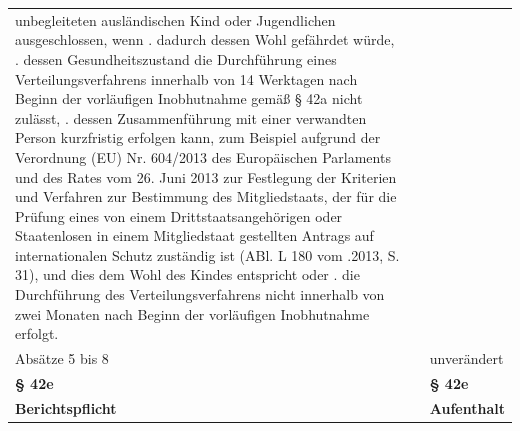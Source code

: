 \documentclass[10pt,a4paper,landscape]{article}
\begin{document}
\begin{longtable}{|L{8.2cm}|L{8.2cm}|L{8.2cm}|}
unbegleiteten ausländischen Kind oder  \newline Jugendlichen ausgeschlossen, wenn   . dadurch dessen Wohl gefährdet würde,   . dessen Gesundheitszustand die  \newline Durchführung eines Verteilungsverfahrens  \newline innerhalb von 14 Werktagen nach Beginn  \newline der vorläufigen Inobhutnahme gemäß \S{}  \newline 42a nicht zulässt,  .   dessen Zusammenführung mit einer  \newline verwandten Person kurzfristig erfolgen  \newline kann, zum Beispiel aufgrund der  \newline Verordnung (EU) Nr. 604/2013 des  \newline Europäischen Parlaments und des Rates  \newline vom 26. Juni 2013 zur Festlegung der  \newline Kriterien und Verfahren zur Bestimmung  \newline des Mitgliedstaats, der für die Prüfung  \newline eines von einem Drittstaatsangehörigen  \newline oder Staatenlosen in einem Mitgliedstaat  \newline gestellten Antrags auf internationalen  \newline Schutz zuständig ist (ABl. L 180 vom  .2013, S. 31), und dies dem Wohl des  \newline Kindes entspricht oder   .   die Durchführung des  \newline Verteilungsverfahrens nicht innerhalb von  \newline \textcolor{diffgreen}{zwei Monaten} nach Beginn der vorläufigen  \newline Inobhutnahme erfolgt. \\
\hhline{|---|}
Absätze 5 bis 8 &  & unverändert \\
\hhline{|---|}
\textbf{\S{} 42e} &  & \textbf{\S{} 42e} \\
\hhline{|---|}
\textbf{\textcolor{diffred}{Berichtspflicht}} &  & \textbf{\textcolor{diffgreen}{Aufenthalt}} \\

\end{longtable}
\end{document}

